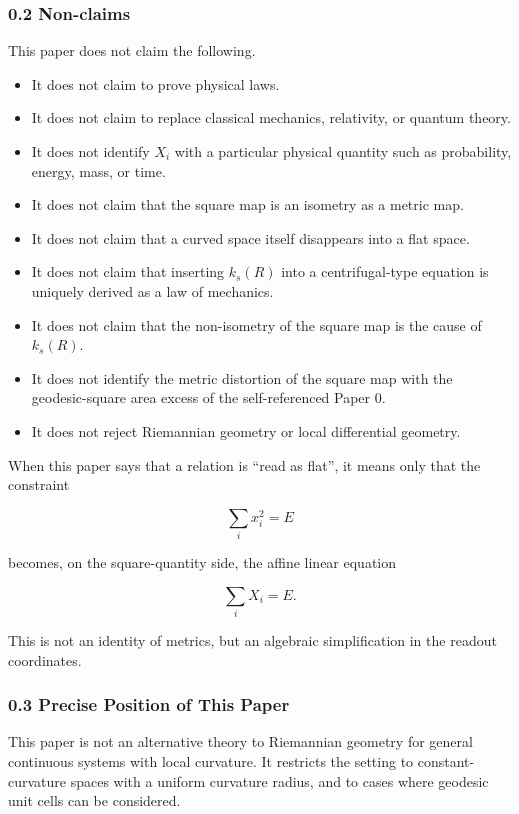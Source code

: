 \documentclass[
]{ltjsarticle}
\providecommand{\tightlist}{%
  \setlength{\itemsep}{0pt}\setlength{\parskip}{0pt}}
\begin{document}
\subsubsection{0.2 Non-claims}\label{non-claims}

This paper does not claim the following.

\begin{itemize}
\tightlist
\item
  It does not claim to prove physical laws.
\item
  It does not claim to replace classical mechanics, relativity, or
  quantum theory.
\item
  It does not identify \(X_i\) with a particular physical quantity such
  as probability, energy, mass, or time.
\item
  It does not claim that the square map is an isometry as a metric map.
\item
  It does not claim that a curved space itself disappears into a flat
  space.
\item
  It does not claim that inserting \(k_s(R)\) into a centrifugal-type
  equation is uniquely derived as a law of mechanics.
\item
  It does not claim that the non-isometry of the square map is the cause
  of \(k_s(R)\).
\item
  It does not identify the metric distortion of the square map with the
  geodesic-square area excess of the self-referenced Paper 0.
\item
  It does not reject Riemannian geometry or local differential geometry.
\end{itemize}

When this paper says that a relation is ``read as flat'', it means only
that the constraint

\[
\sum_i x_i^2=E
\]

becomes, on the square-quantity side, the affine linear equation

\[
\sum_i X_i=E.
\]

This is not an identity of metrics, but an algebraic simplification in
the readout coordinates.

\subsubsection{0.3 Precise Position of This
Paper}\label{precise-position-of-this-paper}

This paper is not an alternative theory to Riemannian geometry for
general continuous systems with local curvature. It restricts the
setting to constant-curvature spaces with a uniform curvature radius,
and to cases where geodesic unit cells can be considered.
\end{document}

